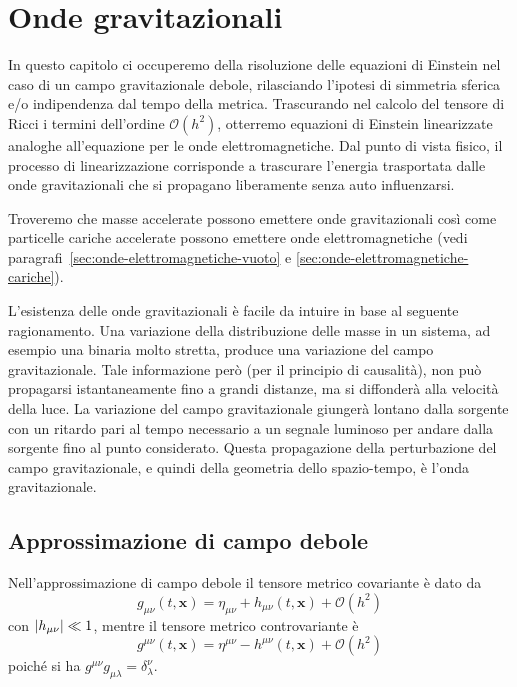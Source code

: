 \chapter{Onde gravitazionali}
\label{cha:onde-grav}

In questo capitolo ci occuperemo della risoluzione delle equazioni di Einstein
nel caso di un campo gravitazionale debole, rilasciando l'ipotesi di simmetria
sferica e/o indipendenza dal tempo della metrica.  Trascurando nel calcolo del
tensore di Ricci i termini dell'ordine $\mathcal{O}(h^2)$, otterremo equazioni
di Einstein linearizzate analoghe all'equazione per le onde elettromagnetiche.
Dal punto di vista fisico, il processo di linearizzazione corrisponde a
trascurare l'energia trasportata dalle onde gravitazionali che si propagano
liberamente senza auto influenzarsi.

Troveremo che masse accelerate possono emettere onde gravitazionali così come
particelle cariche accelerate possono emettere onde elettromagnetiche (vedi
paragrafi~\ref{sec:onde-elettromagnetiche-vuoto} e
\ref{sec:onde-elettromagnetiche-cariche}).

L'esistenza delle onde gravitazionali è facile da intuire in base al seguente
ragionamento.  Una variazione della distribuzione delle masse in un sistema, ad
esempio una binaria molto stretta, produce una variazione del campo
gravitazionale.  Tale informazione però (per il principio di causalità), non può
propagarsi istantaneamente fino a grandi distanze, ma si diffonderà alla
velocità della luce.  La variazione del campo gravitazionale giungerà lontano
dalla sorgente con un ritardo pari al tempo necessario a un segnale luminoso per
andare dalla sorgente fino al punto considerato.  Questa propagazione della
perturbazione del campo gravitazionale, e quindi della geometria dello
spazio-tempo, è l'onda gravitazionale.

\section{Approssimazione di campo debole}
\label{sec:approx-campodebole]}

Nell'approssimazione di campo debole il tensore metrico covariante è dato da
\begin{equation}
  g_{\mu \nu}(t, \bm{x}) = \eta_{\mu \nu} + h_{\mu \nu}(t, \bm{x}) +
  \mathcal{O}(h^2)
  \label{metrica_contro}
\end{equation}
con $\lvert h_{\mu\nu}\rvert \ll 1$, mentre il tensore metrico controvariante è
\begin{equation}
  g^{\mu\nu}(t, \bm{x}) = \eta^{\mu\nu} - h^{\mu\nu}(t, \bm{x}) +
  \mathcal{O}(h^2)
\end{equation}
poiché si ha $g^{\mu\nu} g_{\mu\lambda} = \delta^{\nu}_{\lambda}$.

